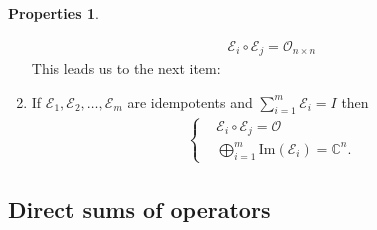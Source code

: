 \documentclass{article}
\theoremstyle{definition}
\newtheorem{prop}{Properties}[section]
\newcommand{\E}{\mathcal{E}}
\newcommand{\ima}{\text{Im}}
\begin{document}
\begin{prop}
\begin{enumerate}
	\begin{align*}
	\boxed{\E_i \circ \E_j = \mathcal{O}_{n\times n}}
	\end{align*}
	This leads us to the next item:
	\item If $\E_1, \E_2, \dots, \E_m$ are idempotents and $\sum^m_{i=1}\E_i = I$ then 
	\begin{align*}
	\begin{cases}
	&\E_i \circ \E_j = \mathcal{O}\\
	&\bigoplus^m_{i=1}\ima(\E_i) = \mathbb{C}^n.
	\end{cases}
	\end{align*}
	\end{enumerate}
\end{prop}


































\subsection{Direct sums of operators}
\end{document}
